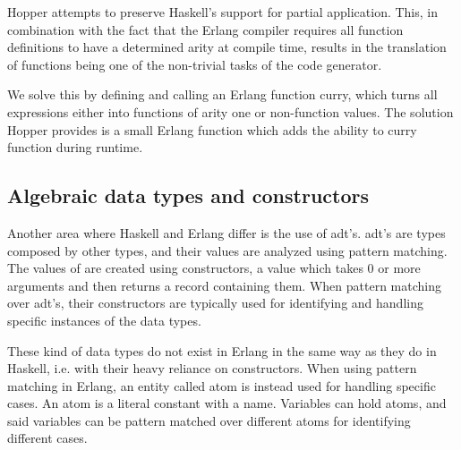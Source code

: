 Hopper attempts to preserve Haskell's support for partial application. This, in combination with the fact that the Erlang compiler requires all function definitions to have a determined arity at compile time, results in the translation of functions being one of the non-trivial tasks of the code generator.%

We solve this by defining and calling an Erlang function curry, which turns all expressions either into functions of arity one or non-function values. %
The solution Hopper provides is a small Erlang function which adds the ability to curry function during runtime. 

\subsection{Algebraic data types and constructors}

Another area where Haskell and Erlang differ is the use of \gls{adt}'s. \gls{adt}'s are types 
composed by other types, and their values are analyzed using pattern matching. %
The values of are created using constructors, a value which takes 0 or more arguments and then returns a record containing them. When pattern matching over \gls{adt}'s, their
constructors are typically used for identifying and handling specific instances of the data types. %

These kind of data types do not exist in Erlang in the same way as they do in Haskell, i.e. with their heavy reliance
on constructors. When using pattern matching in Erlang, an entity called atom is instead used for
handling specific cases. An atom is a literal constant with a name. Variables can hold atoms, and said
variables can be pattern matched over different atoms for identifying different cases.%

